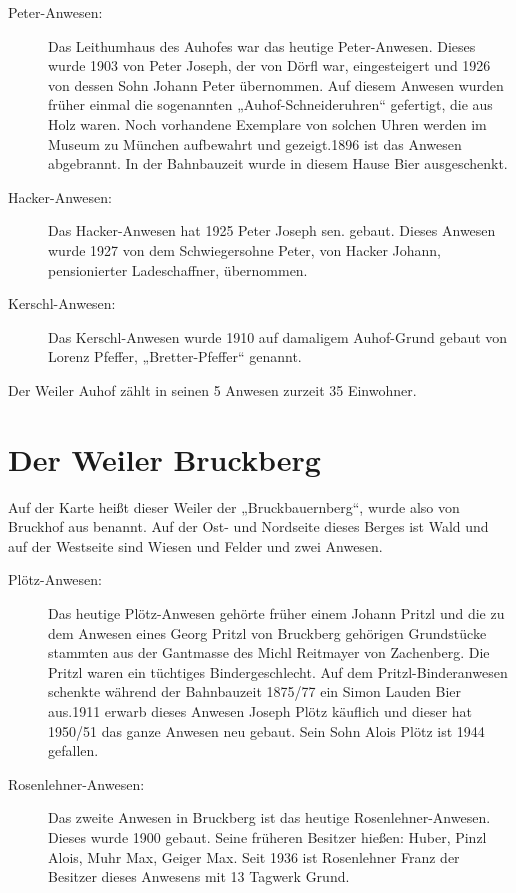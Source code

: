 \documentclass[12pt,a4pager]{book}
\begin{document}
\begin{description}
\item[Peter-Anwesen:] Das Leithumhaus des Auhofes war das heutige Peter-Anwesen.
Dieses wurde 1903 von Peter Joseph, der von Dörfl war, eingesteigert und 1926
von dessen Sohn Johann Peter übernommen. Auf diesem Anwesen wurden früher einmal
die sogenannten „Auhof-Schneideruhren“ gefertigt, die aus Holz waren. Noch
vorhandene Exemplare von solchen Uhren werden im Museum zu München aufbewahrt
und gezeigt.1896 ist das Anwesen abgebrannt. In der Bahnbauzeit wurde in diesem
Hause Bier ausgeschenkt.

\item[Hacker-Anwesen:] Das Hacker-Anwesen hat 1925 Peter Joseph sen. gebaut.
Dieses Anwesen wurde 1927 von dem Schwiegersohne Peter, von Hacker Johann,
pensionierter Ladeschaffner, übernommen.

\item[Kerschl-Anwesen:] Das Kerschl-Anwesen wurde 1910 auf damaligem Auhof-Grund
gebaut von Lorenz Pfeffer, „Bretter-Pfeffer“ genannt.
\end{description}

Der Weiler Auhof zählt in seinen 5 Anwesen zurzeit 35 Einwohner.

\section{Der Weiler Bruckberg}

Auf der Karte heißt dieser Weiler der „Bruckbauernberg“, wurde also von Bruckhof
aus benannt. Auf der Ost- und Nordseite dieses Berges ist Wald und auf der
Westseite sind Wiesen und Felder und zwei Anwesen.

\begin{description}
\item[Plötz-Anwesen:] Das heutige Plötz-Anwesen gehörte früher einem Johann
Pritzl und die zu dem Anwesen eines Georg Pritzl von Bruckberg gehörigen
Grundstücke stammten aus der Gantmasse des Michl Reitmayer von Zachenberg. Die
Pritzl waren ein tüchtiges Bindergeschlecht. Auf dem Pritzl-Binderanwesen
schenkte während der Bahnbauzeit 1875/77 ein Simon Lauden Bier aus.1911 erwarb
dieses Anwesen Joseph Plötz käuflich und dieser hat 1950/51 das ganze Anwesen
neu gebaut. Sein Sohn Alois Plötz ist 1944 gefallen.

\item[Rosenlehner-Anwesen:] Das zweite Anwesen in Bruckberg ist das heutige
Rosenlehner-Anwesen. Dieses wurde 1900 gebaut. Seine früheren Besitzer hießen:
Huber, Pinzl Alois, Muhr Max, Geiger Max. Seit 1936 ist Rosenlehner Franz der
Besitzer dieses Anwesens mit 13 Tagwerk Grund.
\end{description}
\end{document}
